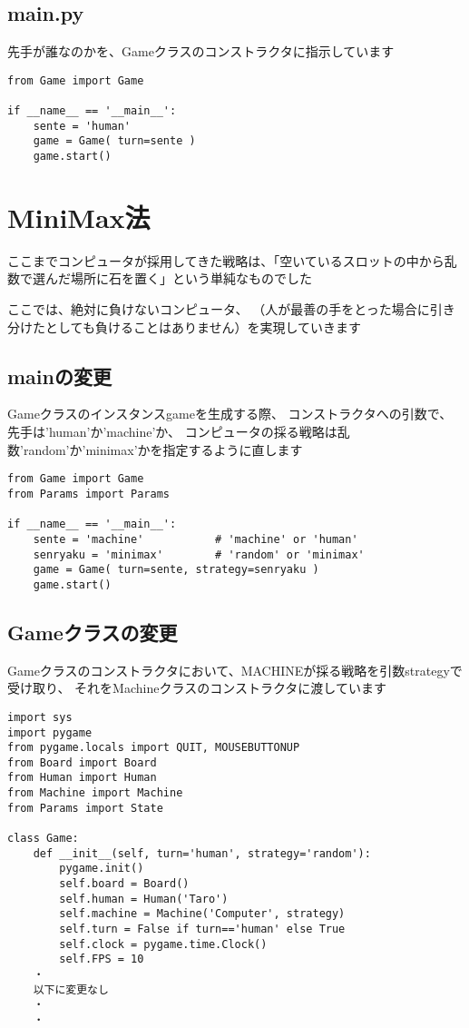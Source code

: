 \documentclass[uplatex,a4paper,11pt,oneside,openany]{jsbook}
\begin{document}
\subsection{main.py}

先手が誰なのかを、Gameクラスのコンストラクタに指示しています

\begin{lstlisting}[caption=main.py,label=prog05-3]
from Game import Game

if __name__ == '__main__':
    sente = 'human'
    game = Game( turn=sente )
    game.start()
\end{lstlisting}%

\section{MiniMax法}

ここまでコンピュータが採用してきた戦略は、「空いているスロットの中から乱数で選んだ場所に石を置く」という単純なものでした

ここでは、絶対に負けないコンピュータ、
（人が最善の手をとった場合に引き分けたとしても負けることはありません）を実現していきます

\subsection{mainの変更}

Gameクラスのインスタンスgameを生成する際、
コンストラクタへの引数で、先手は'human'か'machine'か、
コンピュータの採る戦略は乱数'random'か'minimax'かを指定するように直します

\begin{lstlisting}[caption=main.py,label=minimax00]
from Game import Game
from Params import Params

if __name__ == '__main__':
    sente = 'machine'           # 'machine' or 'human'
    senryaku = 'minimax'        # 'random' or 'minimax'
    game = Game( turn=sente, strategy=senryaku )
    game.start()
\end{lstlisting}

\subsection{Gameクラスの変更}

Gameクラスのコンストラクタにおいて、MACHINEが採る戦略を引数strategyで受け取り、
それをMachineクラスのコンストラクタに渡しています

\begin{lstlisting}[caption=Game.py,label=minimax02]
import sys
import pygame
from pygame.locals import QUIT, MOUSEBUTTONUP
from Board import Board
from Human import Human
from Machine import Machine
from Params import State

class Game:
    def __init__(self, turn='human', strategy='random'):
        pygame.init()
        self.board = Board()
        self.human = Human('Taro')
        self.machine = Machine('Computer', strategy)
        self.turn = False if turn=='human' else True
        self.clock = pygame.time.Clock()
        self.FPS = 10
    ・
    以下に変更なし
    ・
    ・
\end{lstlisting}
\end{document}
